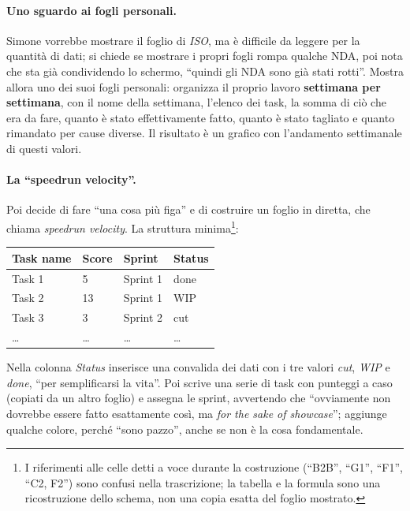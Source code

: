 \paragraph{Uno sguardo ai fogli personali.} Simone vorrebbe mostrare il foglio
di \emph{ISO}, ma è difficile da leggere per la quantità di dati; si chiede se
mostrare i propri fogli rompa qualche NDA, poi nota che sta già condividendo
lo schermo, ``quindi gli NDA sono già stati rotti''. Mostra allora uno dei
suoi fogli personali: organizza il proprio lavoro \textbf{settimana per
settimana}, con il nome della settimana, l'elenco dei task, la somma di ciò
che era da fare, quanto è stato effettivamente fatto, quanto è stato tagliato
e quanto rimandato per cause diverse. Il risultato è un grafico con
l'andamento settimanale di questi valori.

\paragraph{La ``speedrun velocity''.} Poi decide di fare ``una cosa più
figa'' e di costruire un foglio in diretta, che chiama \emph{speedrun
velocity}. La struttura minima\footnote{I riferimenti alle celle detti a voce
durante la costruzione (``B2B'', ``G1'', ``F1'', ``C2, F2'') sono confusi
nella trascrizione; la tabella e la formula sono una ricostruzione dello
schema, non una copia esatta del foglio mostrato.}:
\begin{center}
  \begin{tabular}{@{}llll@{}}
    \toprule
    \textbf{Task name} & \textbf{Score} & \textbf{Sprint} & \textbf{Status} \\
    \midrule
    Task 1 & 5  & Sprint 1 & done \\
    Task 2 & 13 & Sprint 1 & WIP \\
    Task 3 & 3  & Sprint 2 & cut \\
    \dots  & \dots & \dots & \dots \\
    \bottomrule
  \end{tabular}
\end{center}
Nella colonna \emph{Status} inserisce una convalida dei dati con i tre valori
\emph{cut}, \emph{WIP} e \emph{done}, ``per semplificarsi la vita''. Poi
scrive una serie di task con punteggi a caso (copiati da un altro foglio) e
assegna le sprint, avvertendo che ``ovviamente non dovrebbe essere fatto
esattamente così, ma \emph{for the sake of showcase}''; aggiunge qualche
colore, perché ``sono pazzo'', anche se non è la cosa fondamentale.

